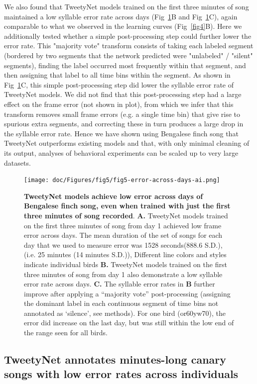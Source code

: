 \documentclass[10pt,letterpaper]{article}
\begin{document}
We also found that TweetyNet models trained on the first three minutes of song 
maintained a low syllable error rate across days (Fig~\ref{fig5}B and Fig~\ref{fig5}C), 
again comparable to what we observed in the learning curves (Fig~\ref{fig4}B).
Here we additionally tested whether a simple post-processing step could 
further lower the error rate. This "majority vote" transform consists of 
taking each labeled segment (bordered by two segments that the network 
predicted were "unlabeled" / "silent" segments), finding the label 
occurred most frequently within that segment, and then assigning that 
label to all time bins within the segment.
As shown in Fig~\ref{fig5}C, this simple post-processing step 
did lower the syllable error rate of TweetyNet models.
We did not find that this post-processing step had a large effect on the 
frame error (not shown in plot), from which we infer that this 
transform removes small frame errors (e.g. a single time bin) that give 
rise to spurious extra segments, 
and correcting these in turn produces a large drop in the syllable error rate.
Hence we have shown using Bengalese finch song 
that TweetyNet outperforms existing models and that, 
with only minimal cleaning of its output, analyses of behavioral experiments 
can be scaled up to very large datasets.

\begin{figure}[!h]
\texttt{[image: doc/Figures/fig5/fig5-error-across-days-ai.png]}
\caption{{\bf TweetyNet models achieve low error across days of Bengalese finch song, 
even when trained with just the first three minutes of song recorded}.
\textbf{A.} TweetyNet models trained on the first three minutes of song 
from day 1 achieved low frame error across days.
The mean duration of the set of songs for each day 
that we used to measure error was 1528 seconds(888.6 S.D.), 
(i.e. 25 minutes (14 minutes S.D.)),
Different line colors and styles indicate individual birds
\textbf{B.} TweetyNet models trained on the first three minutes of song 
from day 1 also demonstrate a low syllable error rate across days.
\textbf{C.}  The syllable error rates in \textbf{B} further improve 
after applying a “majority vote” post-processing 
(assigning the dominant label in each continuous segment of time bins 
not annotated as ‘silence’, see methods).
For one bird (or60yw70), the error did increase on the last day, 
but was still within the low end of the range seen for all birds.
}
\label{fig5}
\end{figure}

\subsection*{TweetyNet annotates minutes-long canary songs with low error rates across individuals}
\end{document}

